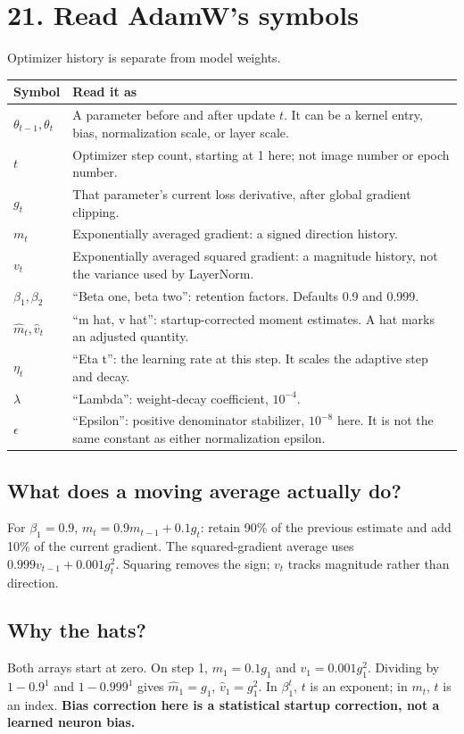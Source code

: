 \documentclass[11pt,letterpaper]{article}
\newcommand{\guidepage}[2]{\clearpage\pdfbookmark[0]{#1}{guide-\thepage}\section*{#1}{\sffamily\color{muted}#2}\par\vspace{5pt}}
\begin{document}
\guidepage{21. Read AdamW's symbols}{Optimizer history is separate from model weights.}
\begin{tabularx}{\linewidth}{@{}lY@{}}\toprule
\textbf{Symbol} & \textbf{Read it as}\\\midrule
$\theta_{t-1},\theta_t$ & A parameter before and after update $t$. It can be a kernel entry, bias, normalization scale, or layer scale.\\
$t$ & Optimizer step count, starting at 1 here; not image number or epoch number.\\
$g_t$ & That parameter's current loss derivative, after global gradient clipping.\\
$m_t$ & Exponentially averaged gradient: a signed direction history.\\
$v_t$ & Exponentially averaged squared gradient: a magnitude history, not the variance used by LayerNorm.\\
$\beta_1,\beta_2$ & ``Beta one, beta two'': retention factors. Defaults 0.9 and 0.999.\\
$\widehat m_t,\widehat v_t$ & ``m hat, v hat'': startup-corrected moment estimates. A hat marks an adjusted quantity.\\
$\eta_t$ & ``Eta t'': the learning rate at this step. It scales the adaptive step and decay.\\
$\lambda$ & ``Lambda'': weight-decay coefficient, $10^{-4}$.\\
$\epsilon$ & ``Epsilon'': positive denominator stabilizer, $10^{-8}$ here. It is not the same constant as either normalization epsilon.\\\bottomrule
\end{tabularx}

\subsection*{What does a moving average actually do?}
For $\beta_1=0.9$, $m_t=0.9m_{t-1}+0.1g_t$: retain 90\% of the previous estimate and add 10\% of the current gradient. The squared-gradient average uses $0.999v_{t-1}+0.001g_t^2$. Squaring removes the sign; $v_t$ tracks magnitude rather than direction.

\subsection*{Why the hats?}
Both arrays start at zero. On step 1, $m_1=0.1g_1$ and $v_1=0.001g_1^2$. Dividing by $1-0.9^1$ and $1-0.999^1$ gives $\widehat m_1=g_1$, $\widehat v_1=g_1^2$. In $\beta_1^t$, $t$ is an exponent; in $m_t$, $t$ is an index. \textbf{Bias correction here is a statistical startup correction, not a learned neuron bias.}
\end{document}
